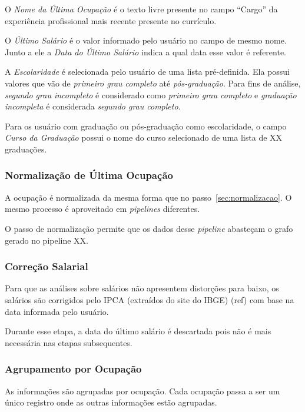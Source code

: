\documentclass[12pt,a4paper]{article}
\begin{document}
O \textit{Nome da Última Ocupação} é o texto livre presente no campo \enquote{Cargo} da experiência profissional mais recente presente no currículo.

O \textit{Último Salário} é o valor informado pelo usuário no campo de mesmo nome. Junto a ele a \textit{Data do Último Salário} indica a qual data esse valor é referente.

A \textit{Escolaridade} é selecionada pelo usuário de uma lista pré-definida. Ela possui valores que vão de \textit{primeiro grau completo} até \textit{pós-graduação}. Para fins de análise, \textit{segundo grau incompleto} é considerado como \textit{primeiro grau completo} e \textit{graduação incompleta} é considerada \textit{segundo grau completo}.

Para os usuário com graduação ou pós-graduação como escolaridade, o campo \textit{Curso da Graduação} possui o nome do curso selecionado de uma lista de XX graduações.

\subsubsection{Normalização de Última Ocupação}

A ocupação é normalizada da mesma forma que no passo~\ref{sec:normalizacao}. O mesmo processo é aproveitado em \textit{pipelines} diferentes.

O passo de normalização permite que os dados desse \textit{pipeline} abasteçam o grafo gerado no pipeline XX.

\subsubsection{Correção Salarial}

Para que as análises sobre salários não apresentem distorções para baixo, os salários são corrigidos pelo IPCA (extraídos do site do IBGE) (ref) com base na data informada pelo usuário.

Durante esse etapa, a data do último salário é descartada pois não é mais necessária nas etapas subsequentes.

\subsubsection{Agrupamento por Ocupação}

As informações são agrupadas por ocupação. Cada ocupação passa a ser um único registro onde as outras informações estão agrupadas.
\end{document}

